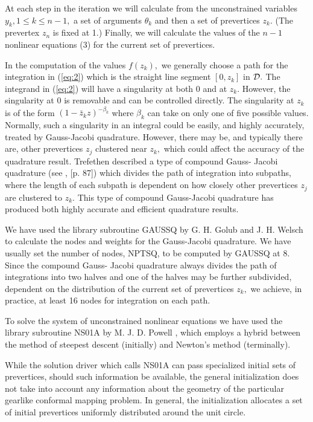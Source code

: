 \documentclass[12pt]{article}%
\begin{document}
At each step in the iteration we will calculate from the
unconstrained variables $y_k , 1 \leq k \leq n-1,$ a set of arguments
$\theta_k$ and then a set of prevertices $z_k.$ (The prevertex $z_n$
is fixed at 1.)  Finally, we will calculate the values of the $n-1$
nonlinear equations (3) for the current set of prevertices.

In the computation of the values $f(z_k),$ we generally choose 
a path for the integration in (\ref{eq:2}) which is the straight line 
segment $[0,z_k ]$ in ${\cal D}.$  The integrand in (\ref{eq:2}) will have a
singularity  
at both $0$ and at $z_k.$  However, the singularity at $0$ is removable and 
can be controlled directly.  The singularity at $z_k$  is of the
form $(1 -\bar{z}_k z)^{-\beta_k}$  where  $\beta_k$  can take on only
one of five possible  
values.  Normally, such a singularity in an integral could be 
easily, and highly accurately, treated by Gauss-Jacobi quadrature.  
However, there may be, and typically there are, other prevertices 
$z_j$  clustered near $z_k,$ which could affect the accuracy of the 
quadrature result.  Trefethen described a type of compound Gauss-
Jacobi quadrature (see \cite{10}, [p. 87]) which divides the path of 
integration into subpaths, where the length of each subpath is 
dependent on how closely other prevertices $z_j$  are clustered to $z_k.$  
This type of compound Gauss-Jacobi quadrature has produced both 
highly accurate and efficient quadrature results.

We have used the library subroutine GAUSSQ by G. H. Golub and 
J. H. Welsch \cite{4} to calculate the nodes and weights for the 
Gauss-Jacobi quadrature.  We have usually set the number of nodes, 
NPTSQ, to be computed by GAUSSQ at 8.  Since the compound Gauss-
Jacobi quadrature always divides the path of integrations into two 
halves and one of the halves may be further subdivided, dependent 
on the distribution of the current set of prevertices $z_k,$ we 
achieve, in practice, at least 16 nodes for integration on each 
path.  

To solve the system of unconstrained nonlinear equations we 
have used the library subroutine NS01A by M. J. D. Powell \cite{8}, 
which employs a hybrid between the method of steepest descent 
(initially) and Newton's method (terminally).  

While the solution driver which calls NS01A can pass 
specialized initial sets of prevertices, should such information 
be available, the general initialization does not take into 
account any information about the geometry of the particular 
gearlike conformal mapping problem.  In general, the 
initialization allocates a set of initial prevertices uniformly 
distributed around the unit circle.  
\end{document}
